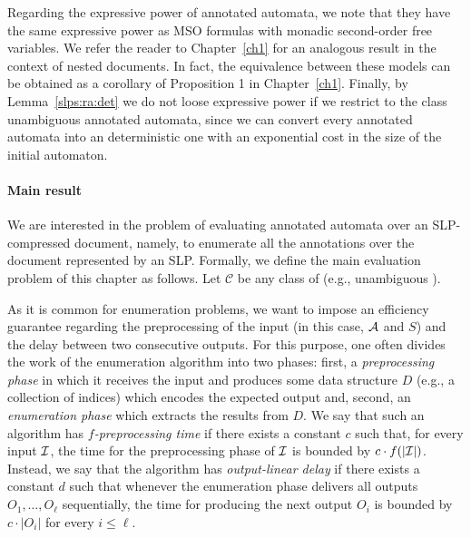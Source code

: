 \newcommand{\blabla}{Proposition 1 }

Regarding the expressive power of annotated automata, we note that they have the same expressive power as MSO formulas with monadic second-order free variables. We refer the reader to Chapter~\ref{ch1} for an analogous result in the context of nested documents. In fact, the equivalence between these models can be obtained as a corollary of \blabla in Chapter~\ref{ch1}.
Finally, by Lemma~\ref{slps:ra:det} we do not loose expressive power if we restrict to the class unambiguous annotated automata, since we can convert every annotated automata into an deterministic one with an exponential cost in the size of the initial automaton. 

\paragraph{Main result} 
We are interested in the problem of evaluating annotated automata over an SLP-compressed document, namely, to enumerate all the annotations over the document represented by an SLP. Formally, we define the main evaluation problem of this chapter as follows. Let $\mathcal{C}$ be any class of \rt (e.g., unambiguous \rt). 

\vspace{0.5em}

\begin{center}
\end{center}

\vspace{0.5em}

As it is common for enumeration problems, we want to impose an efficiency guarantee regarding the preprocessing of the input (in this case, $\mathcal{A}$ and $S$) and the delay between two consecutive outputs. For this purpose, one often divides the work of the enumeration algorithm into two phases: first, a \emph{preprocessing phase} in which it receives the input and produces some data structure $D$ (e.g., a collection of indices) which encodes the expected output and, second, an \emph{enumeration phase} which extracts the results from $D$. 
We say that such an algorithm has \emph{$f$-preprocessing time} if there exists a constant $c$ such that, for every input $\mathcal{I}$, the time for the preprocessing phase of $\mathcal{I}$ is bounded by $c \cdot f(|\mathcal{I}|)$.   
Instead, we say that the algorithm has \emph{output-linear delay} if there exists a constant $d$ such that whenever the enumeration phase delivers all outputs $O_1, \ldots, O_\ell$ sequentially, the time for producing the next output $O_i$ is bounded by $c \cdot |O_i|$ for every $i \leq \ell$.

